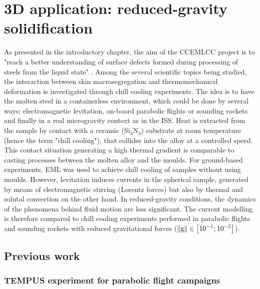 \section{3D application: reduced-gravity solidification}

As presented in the introductory chapter, the aim of the CCEMLCC project is to "reach a better
understanding of surface defects formed during processing of steels from the liquid state" \citep{gandin_project_2014}.
Among the several scientific topics being studied, the interaction between skin macrosegregation 
and thermomechanical deformation is investigated through chill cooling experiments.
The idea is to have the molten steel in a containerless environment, which could be done by several ways: 
electromagnetic levitation, on-board parabolic flights or sounding rockets and finally
in a real microgravity context as in the ISS. Heat is extracted from the sample by contact with a ceramic 
(Si$_3$N$_4$) substrate at room temperature (hence the term "chill cooling"), that collides into the alloy at a controlled speed.
This contact situation generating a high thermal gradient is comparable to casting processes between the molten alloy and the moulds.
For ground-based experiments, EML was used to achieve chill cooling of samples without using moulds. 
However, levitation induces currents in the spherical sample, generated by means of electromagnetic stirring (Lorentz forces) 
but also by thermal and solutal convection on the other hand. In reduced-gravity conditions, the dynamics of the phenomena behind fluid motion are less significant.
The current modelling is therefore compared to chill cooling experiments performed in parabolic flights and sounding rockets 
with reduced gravitational forces ($\lVert \boldsymbol{\text{g}} \rVert \in \left[ 10^{-1};10^{-5} \right]$\si{\uacceleration}).


\subsection{Previous work}

\subsubsection{TEMPUS experiment for parabolic flight campaigns}


